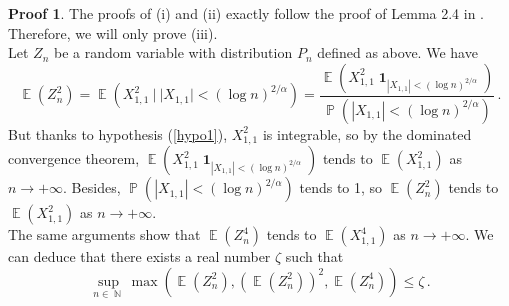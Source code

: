 \documentclass[11pt,a4paper]{article}
\DeclareMathOperator{\E}{\mathbb{E}}
\DeclareMathOperator{\N}{\mathbb{N}}
\DeclareMathOperator{\PR}{\mathbb{P}}
\DeclareMathOperator{\1}{\mathbf{1}}
\theoremstyle{definition}
\newtheorem*{Proof}{Proof}
\begin{document}
\begin{Proof}
The proofs of (i) and (ii) exactly follow the proof of Lemma 2.4 in \cite{BC}. Therefore, we will only prove (iii).\\
Let $Z_n$ be a random variable with distribution $P_n$ defined as above. We have
\begin{displaymath}
\E(Z_n^2) = \E( X_{1,1}^2 \ | \ |X_{1,1}| < (\log n)^{2/\alpha} ) = \frac{\E \left( X_{1,1}^2 \1_{|X_{1,1}| < (\log n)^{2/\alpha}} \right)}{\PR(|X_{1,1}| < (\log n)^{2/\alpha})} \, .
\end{displaymath}
But thanks to hypothesis (\ref{hypo1}), $X_{1,1}^2$ is integrable, so by the dominated convergence theorem, $\E \left( X_{1,1}^2 \1_{|X_{1,1}| < (\log n)^{2/\alpha}} \right)$ tends to $\E(X_{1,1}^2)$ as $n \to +\infty$. Besides, $\PR(|X_{1,1}| < (\log n)^{2/\alpha})$ tends to 1, so $\E(Z_n^2)$ tends to $\E(X_{1,1}^2)$ as $n \to +\infty$.\\
The same arguments show that $\E(Z_n^4)$ tends to $\E(X_{1,1}^4)$ as $n \to +\infty$. We can deduce that there exists a real number $\zeta$ such that
\begin{displaymath}
\sup_{n \in \N} \max \left( \E(Z_n^2) , (\E(Z_n^2))^2 , \E(Z_n^4) \right) \le \zeta \, .
\end{displaymath}


\end{Proof}
\end{document}
